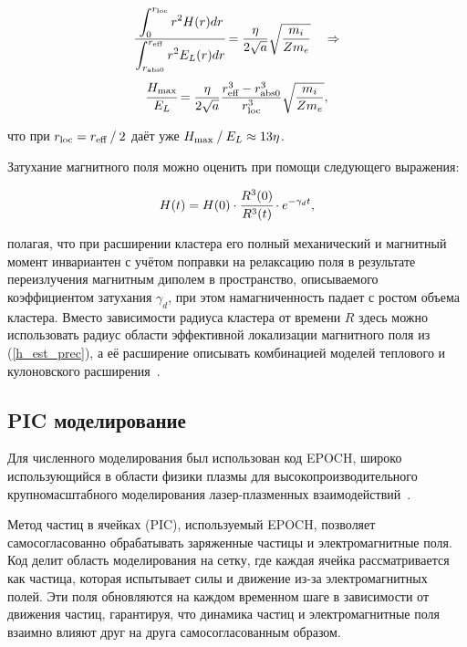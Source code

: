    \begin{equation}
        \cfrac{\displaystyle\int_{0}^{r_{\textrm{loc}}} r^2 H(r) dr}{\displaystyle\int_{r_{\textrm{abs}0}}^{r_{\textrm{eff}}} r^2 E_L(r) dr}  = \frac{\eta }{2 \sqrt{a}} \sqrt{\frac{m_i}{Z m_e}} \quad \Rightarrow 
    \end{equation}
    \begin{equation}
        \cfrac{H_{\max}}{E_L} = \frac{\eta }{2 \sqrt{a}} \frac{r_{\textrm{eff}}^3 - r_{\textrm{abs}0}^3}{r_{\textrm{loc}} ^ 3} \sqrt{\frac{m_i}{Z m_e}},
        \label{h_est_prec} 
    \end{equation}

\noindent что при $r_{\textrm{loc}} = {r_{\textrm{eff}}}\:/\:{2}$ даёт уже ${H_{\max}}\:/\:{E_L} \approx 13 \eta$.

Затухание магнитного поля можно оценить при помощи следующего выражения:

    \begin{equation}
        H(t) = H(0) \cdot \cfrac{R^3(0)}{R^3(t)}\cdot e^{-\gamma_d t},
        \label{H_evo_inva}
    \end{equation}

\noindent полагая, что при расширении кластера его полный механический и магнитный момент инвариантен с учётом поправки на релаксацию поля в результате переизлучения магнитным диполем в пространство, описываемого коэффициентом затухания $\gamma_d$, при этом намагниченность падает с ростом объема кластера. Вместо зависимости радиуса кластера от времени $R$ здесь можно использовать радиус области эффективной локализации магнитного поля из (\ref{h_est_prec}), а её расширение описывать комбинацией моделей теплового и кулоновского расширения~\cite{andr_plat_2021}.

\subsection{PIC моделирование}

Для численного моделирования был использован код EPOCH, широко использующийся в области физики плазмы для высокопроизводительного крупномасштабного моделирования лазер-плазменных взаимодействий~\cite{epochpic}.

Метод частиц в ячейках (PIC), используемый EPOCH, позволяет самосогласованно обрабатывать заряженные частицы и электромагнитные поля. Код делит область моделирования на сетку, где каждая ячейка рассматривается как частица, которая испытывает силы и движение из-за электромагнитных полей. Эти поля обновляются на каждом временном шаге в зависимости от движения частиц, гарантируя, что динамика частиц и электромагнитные поля взаимно влияют друг на друга самосогласованным образом.

